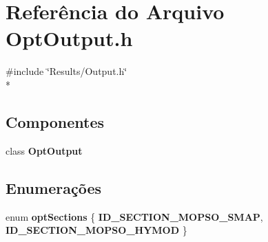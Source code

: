 \section{Referência do Arquivo Opt\+Output.\+h}
\label{_opt_output_8h}
{\ttfamily \#include \char`\"{}Results/\+Output.\+h\char`\"{}}\\*
\subsection*{Componentes}
\begin{DoxyCompactItemize}
\item 
class {\bf Opt\+Output}
\end{DoxyCompactItemize}
\subsection*{Enumerações}
\begin{DoxyCompactItemize}
\item 
enum {\bf opt\+Sections} \{ {\bf I\+D\+\_\+\+S\+E\+C\+T\+I\+O\+N\+\_\+\+M\+O\+P\+S\+O\+\_\+\+S\+M\+AP}, 
{\bf I\+D\+\_\+\+S\+E\+C\+T\+I\+O\+N\+\_\+\+M\+O\+P\+S\+O\+\_\+\+H\+Y\+M\+OD}
 \}
\end{DoxyCompactItemize}
